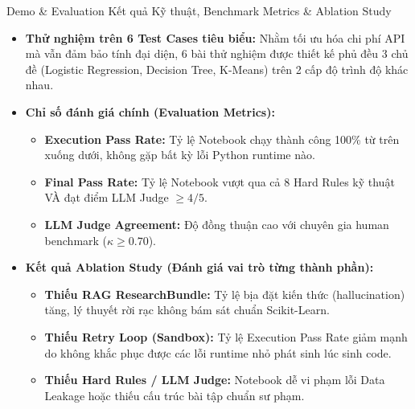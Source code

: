 \documentclass[aspectratio=169, 10pt, t]{beamer}
\begin{document}
\begin{frame}[fragile]{Demo \& Evaluation}
  Kết quả Kỹ thuật, Benchmark Metrics \& Ablation Study
  \begin{itemize}
    \item \textbf{Thử nghiệm trên 6 Test Cases tiêu biểu:} Nhằm tối ưu hóa chi phí API mà vẫn đảm bảo tính đại diện, 6 bài thử nghiệm được thiết kế phủ đều 3 chủ đề (Logistic Regression, Decision Tree, K-Means) trên 2 cấp độ trình độ khác nhau.
    \item \textbf{Chỉ số đánh giá chính (Evaluation Metrics):}
      \begin{itemize}
        \item \textbf{Execution Pass Rate:} Tỷ lệ Notebook chạy thành công 100\% từ trên xuống dưới, không gặp bất kỳ lỗi Python runtime nào.
        \item \textbf{Final Pass Rate:} Tỷ lệ Notebook vượt qua cả 8 Hard Rules kỹ thuật VÀ đạt điểm LLM Judge $\ge 4/5$.
        \item \textbf{LLM Judge Agreement:} Độ đồng thuận cao với chuyên gia human benchmark ($\kappa \ge 0.70$).
      \end{itemize}
    \item \textbf{Kết quả Ablation Study (Đánh giá vai trò từng thành phần):}
      \begin{itemize}
        \item \textbf{Thiếu RAG ResearchBundle:} Tỷ lệ bịa đặt kiến thức (hallucination) tăng, lý thuyết rời rạc không bám sát chuẩn Scikit-Learn.
        \item \textbf{Thiếu Retry Loop (Sandbox):} Tỷ lệ Execution Pass Rate giảm mạnh do không khắc phục được các lỗi runtime nhỏ phát sinh lúc sinh code.
        \item \textbf{Thiếu Hard Rules / LLM Judge:} Notebook dễ vi phạm lỗi Data Leakage hoặc thiếu cấu trúc bài tập chuẩn sư phạm.
      \end{itemize}
  \end{itemize}
\end{frame}
\end{document}
